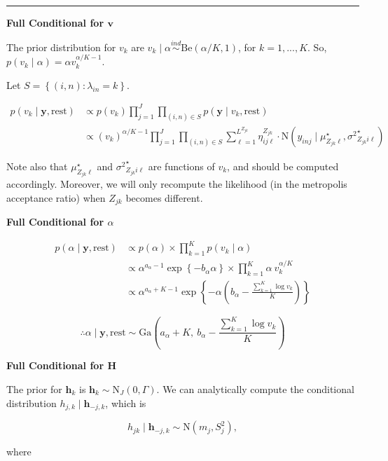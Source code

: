 \documentclass[12pt,]{article}
\newcommand{\p}[1]{\left(#1\right)}
\newcommand{\bc}[1]{ \left\{#1\right\} }
\newcommand{\N}{ \mathcal{N} }
\newcommand{\ind}{\overset{ind}{\sim}}
\def\N{\text{N}}
\def\G{\text{Ga}}
\def\Be{\text{Be}}
\def\lin{\lambda_{in}}
\def\y{\bm{y}}
\def\mus{\mu^\star}
\def\sss{{\sigma^2}^\star}
\def\rest{\text{rest}}
\def\h{\bm{h}}
\begin{document}
\vspace{5em}
\hrule
\vspace{5em}

\textbf{Full Conditional for $\bm v$}

The prior distribution for \(v_k\) are
\(v_k \mid \alpha \ind \Be(\alpha/K, 1)\), for \(k = 1,...,K\). So,
\(p(v_k \mid \alpha) = \alpha v_k^{\alpha/K-1}\).

Let \(S = \bc{(i,n)\colon \lin = k}\).

\begin{align*}
p(v_k \mid \y, \rest) &\propto p(v_k) \prod_{j=1}^J\prod_{(i,n)\in S} p(\y \mid
  v_k, \rest) \\
&\propto (v_k)^{\alpha/K-1} \prod_{j=1}^J \prod_{(i,n)\in S}
\sum_{\ell=1}^{L^{Z_{jk}}} \eta^{Z_{jk}}_{ij\ell} \cdot
\N(y_{inj} \mid \mus_{Z_{jk}\ell}, \sss_{Z_{jk}i\ell})
\end{align*}


Note also that \(\mus_{Z_{jk}\ell}\) and \(\sss_{Z_{jk}i\ell}\) are
functions of \(v_k\), and should be computed accordingly. Moreover, we
will only recompute the likelihood (in the metropolis acceptance ratio)
when \(Z_{jk}\) becomes different.
\vspace{2em}


\textbf{Full Conditional for $\alpha$}

\begin{align*}
p(\alpha \mid \y, \rest) &\propto p(\alpha) \times \prod_{k=1}^K p(v_k \mid
  \alpha) \\
&\propto \alpha^{a_\alpha - 1} \exp\bc{-b_\alpha \alpha} \times \prod_{k=1}^K 
\alpha~v_k^{\alpha/K} \\
&\propto \alpha^{a_\alpha + K -1} \exp\bc{-\alpha\p{b_\alpha - 
\frac{\sum_{k=1}^K \log v_k}{K}}}
\end{align*}

\[
\therefore \alpha \mid \y, \rest \sim 
\G\p{a_\alpha + K,~ b_\alpha - \frac{\sum_{k=1}^K \log v_k}{K}}
\]
\vspace{2em}


\textbf{Full Conditional for $\bm H$}

The prior for \(\h_k\) is \(\h_k \sim \N_J(0, \Gamma)\). We can
analytically compute the conditional distribution
\(h_{j,k} \mid \h_{-j,k}\), which is

\[
h_{jk}  \mid \h_{-j,k} \sim \N(m_j, S^2_j),
\]

where
\end{document}
